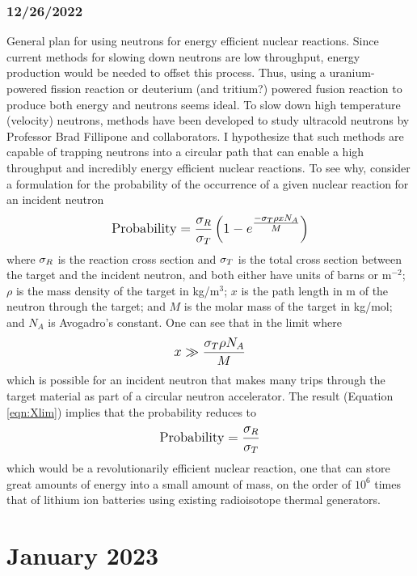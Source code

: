 \documentclass[12pt]{article}
\begin{document}
\subsubsection{12/26/2022}
General plan for using neutrons for energy efficient nuclear reactions. Since current methods for slowing down neutrons are low throughput, energy production would be needed to offset this process. Thus, using a uranium-powered fission reaction or deuterium (and tritium?) powered fusion reaction to produce both energy and neutrons seems ideal. To slow down high temperature (velocity) neutrons, methods have been developed to study ultracold neutrons by Professor Brad Fillipone and collaborators. I hypothesize that such methods are capable of trapping neutrons into a circular path that can enable a high throughput and incredibly energy efficient nuclear reactions. To see why, consider a formulation for the probability of the occurrence of a given nuclear reaction for an incident neutron
\begin{equation}\label{eqn:RxnProb}
\mathlarger{\text{Probability} = \frac{\sigma\sb{R}}{\sigma\sb{T}}\left(1-e^\mathlarger{\frac{-\sigma\sb{T} \rho x N\sb{A}}{M}}\right)}
\end{equation}
where $\sigma\sb{R}$ is the reaction cross section and $\sigma\sb{T}$ is the total cross section between the target and the incident neutron, and both either have units of barns or m$^{-2}$; $\rho$ is the mass density of the target in kg/m$^3$; $x$ is the path length in m of the neutron through the target; and $M$ is the molar mass of the target in kg/mol; and $N_A$ is Avogadro's constant. One can see that in the limit where 
\begin{equation}\label{eqn:Xlim}
\mathlarger{
x\gg \frac{\sigma\sb{T} \rho N\sb{A}}{M}
}
\end{equation}
which is possible for an incident neutron that makes many trips through the target material as part of a circular neutron accelerator. The result (Equation \ref{eqn:Xlim}) implies that the probability reduces to 
\begin{equation}\label{eqn:Plim}
\mathlarger{
    \text{Probability} = \frac{\sigma\sb{R}}{\sigma\sb{T}}
}
\end{equation}
which would be a revolutionarily efficient nuclear reaction, one that can store great amounts of energy into a small amount of mass, on the order of $10^{6}$ times that of lithium ion batteries using existing radioisotope thermal generators. 
\section{January 2023}
\end{document}
